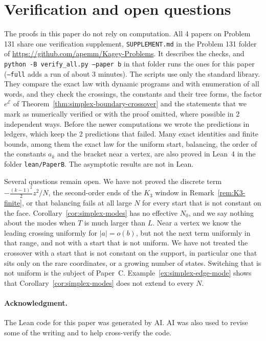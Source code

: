 \documentclass[11pt]{article}
\theoremstyle{definition}
\theoremstyle{remark}
\begin{document}






\section{Verification and open questions}\label{sec:verify}

The proofs in this paper do not rely on computation. All 4 papers on
Problem 131 share one verification supplement, \texttt{SUPPLEMENT.md} in the
Problem 131 folder of \url{https://github.com/apemm/Kagey-Problems}. It
describes the checks, and \texttt{python -B verify\_all.py --paper b} in that
folder runs the ones for this paper (\texttt{--full} adds a run of about 3
minutes). The scripts use only the standard library. They compare the exact
law with dynamic programs and with enumeration of all words, and they check the
crossings, the constants and their tree forms, the factor $e^{\mathcal E}$ of
Theorem~\ref{thm:simplex-boundary-crossover} and the statements that we mark
as numerically verified or with the proof omitted, where possible in 2
independent ways. Before the newer
computations we wrote the predictions in ledgers, which keep the 2 predictions
that failed. Many exact identities and finite bounds, among them the exact
law for the uniform start, balancing, the order of the constants $a_k$ and the
bracket near a vertex,
are also proved in Lean~4 in the folder \texttt{lean/PaperB}. The asymptotic
results are not in Lean.

Several questions remain open. We have not proved the discrete term
$-\frac{(k-1)^2}2z^2/N$, the second-order ends of the $K_3$ window in
Remark~\ref{rem:K3-finite}, or that balancing fails at all large $N$ for every
start that is not constant on the face. Corollary~\ref{cor:simplex-modes} has no effective
$N_0$, and we say nothing about the modes when $T$ is much larger than $L$. Near
a vertex we know the leading crossing uniformly for $|a|=o(b)$, but not the
next term uniformly in that range, and not with a start that is not uniform. We
have not treated the crossover with a start that is not constant on the
support, in particular one that sits only on the rare coordinates, or a growing
number of states. Switching that is not uniform is the subject of
Paper~C. Example~\ref{ex:simplex-edge-mode} shows that
Corollary~\ref{cor:simplex-modes} does not extend to every $N$.

\paragraph{Acknowledgment.}
The Lean code for this paper was generated by AI. AI was also used to revise
some of the writing and to help cross-verify the code.
\end{document}
